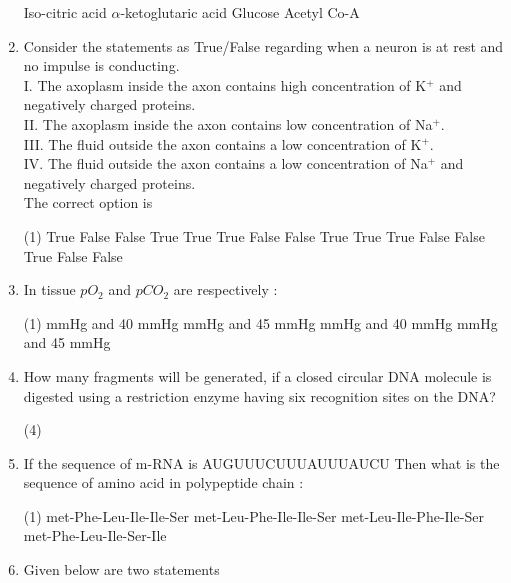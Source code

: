 \documentclass[twocolumn]{article}
\begin{document}
\begin{enumerate}
\begin{tasks}
            \task Iso-citric acid
            \task \(\alpha\)-ketoglutaric acid
            \task Glucose
            \task Acetyl Co-A
        \end{tasks}
    \item Consider the statements as True/False regarding when a neuron is at rest and no impulse is conducting.\\
    I. The axoplasm inside the axon contains high concentration of K\(^+\) and negatively charged proteins.\\
    II. The axoplasm inside the axon contains low concentration of Na\(^+\).\\
    III. The fluid outside the axon contains a low concentration of K\(^+\).\\
    IV. The fluid outside the axon contains a low concentration of Na\(^+\) and negatively charged proteins.\\
    The correct option is
        \begin{tasks}(1)
            \task True \quad False \quad False \quad True
            \task True \quad True \quad False \quad False
            \task True \quad True \quad True \quad False
            \task False \quad True \quad False \quad False
        \end{tasks}
    \item In tissue \(pO_2\) and \(pCO_2\) are respectively :
        \begin{tasks}(1)
             mmHg and 40 mmHg
             mmHg and 45 mmHg
             mmHg and 40 mmHg
             mmHg and 45 mmHg
        \end{tasks}
    \item How many fragments will be generated, if a closed circular DNA molecule is digested using a restriction enzyme having six recognition sites on the DNA?
        \begin{tasks}(4)
        \end{tasks}
    \item If the sequence of m-RNA is AUGUUUCUUUAUUUAUCU Then what is the sequence of amino acid in polypeptide chain :
        \begin{tasks}(1)
            \task met-Phe-Leu-Ile-Ile-Ser
            \task met-Leu-Phe-Ile-Ile-Ser
            \task met-Leu-Ile-Phe-Ile-Ser
            \task met-Phe-Leu-Ile-Ser-Ile
        \end{tasks}
    \item Given below are two statements\\

\end{enumerate}
\end{document}

